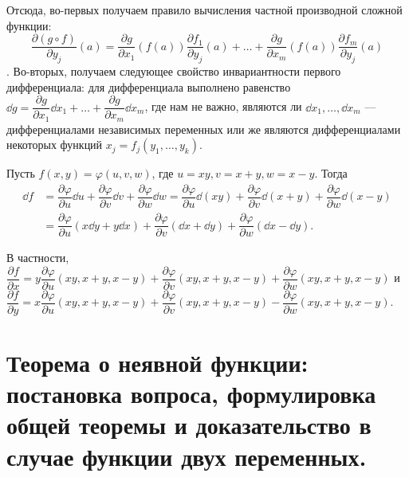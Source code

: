 \documentclass[a4paper]{article}
\theoremstyle{named}
\begin{document}
\begin{remark*}
        Отсюда, во-первых получаем правило вычисления частной производной сложной функции:
        $$\dfrac{\partial (g\circ f)}{\partial y_j}(a) =
        \dfrac{\partial g}{\partial x_1}(f(a)) \dfrac{\partial f_1}{\partial y_j}(a)+\ldots+
        \dfrac{\partial g}{\partial x_m}(f(a)) \dfrac{\partial f_m}{\partial y_j}(a)$$.
        Во-вторых, получаем следующее свойство инвариантности первого дифференциала:
        для дифференциала выполнено равенство
        $\dd g = \dfrac{\partial g}{\partial x_1}\dd x_1+\ldots+\dfrac{\partial g}{\partial x_m}\dd x_m$,
        где нам не важно, являются ли $
        \dd x_1,\ldots, \dd x_m$ --- дифференциалами независимых переменных
        или же являются дифференциалами некоторых функций $x_j = f_j(y_1,\ldots, y_k)$.
    \end{remark*}

    \begin{example*}
        Пусть $f(x,y) = \varphi(u, v, w)$, где $u=xy, v= x+y, w=x-y$.
        Тогда
        \begin{align*}
            \dd f 
            &= \dfrac{\partial \varphi}{\partial u} \dd u + \dfrac{\partial \varphi}{\partial v} \dd v + \dfrac{\partial \varphi}{\partial w} \dd w 
            = \dfrac{\partial \varphi}{\partial u} \dd(xy) + \dfrac{\partial \varphi}{\partial v} \dd(x+y) + \dfrac{\partial \varphi}{\partial w} \dd(x-y) \\
            &= \dfrac{\partial \varphi}{\partial u} (x\dd y + y\dd x) +
            \dfrac{\partial \varphi}{\partial v} (\dd x+\dd y) + \dfrac{\partial \varphi}{\partial w} (\dd x - \dd y).
        \end{align*}

        В частности,
        $\dfrac{\partial f}{\partial x} = y\dfrac{\partial \varphi}{\partial u}(xy, x+y, x-y) +
        \dfrac{\partial \varphi}{\partial v}(xy, x+y, x-y) +  \dfrac{\partial \varphi}{\partial w}(xy, x+y, x-y)$
        и $\dfrac{\partial f}{\partial y} = x\dfrac{\partial \varphi}{\partial u}(xy, x+y, x-y) +
        \dfrac{\partial \varphi}{\partial v}(xy, x+y, x-y) -  \dfrac{\partial \varphi}{\partial w}(xy, x+y, x-y)$.
    \end{example*}

    \section{Теорема о неявной функции: постановка вопроса, формулировка общей теоремы и доказательство в случае функции двух переменных.}
\end{document}
